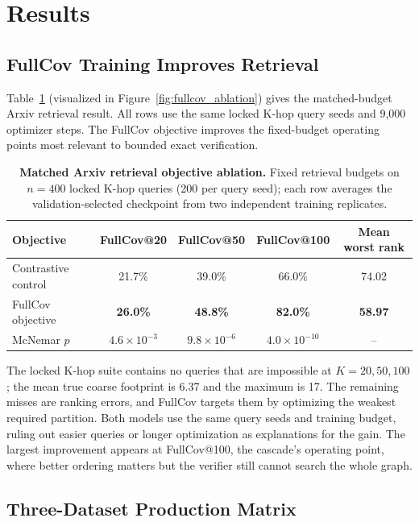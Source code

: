 \documentclass{article}
\begin{document}
\section{Results}

\subsection{FullCov Training Improves Retrieval}

Table~\ref{tab:loss_ablation} (visualized in Figure~\ref{fig:fullcov_ablation}) gives the matched-budget Arxiv retrieval result. All rows use the same locked K-hop query seeds and 9,000 optimizer steps. The FullCov objective improves the fixed-budget operating points most relevant to bounded exact verification.

\begin{table}[t]
\centering
\caption{\textbf{Matched Arxiv retrieval objective ablation.} Fixed retrieval budgets on $n{=}400$ locked K-hop queries (200 per query seed); each row averages the validation-selected checkpoint from two independent training replicates.}
\label{tab:loss_ablation}
\small
\setlength{\tabcolsep}{5pt}
\begin{tabular}{lcccc}
\toprule
\textbf{Objective} & \textbf{FullCov@20} & \textbf{FullCov@50} & \textbf{FullCov@100} & \textbf{Mean worst rank} \\
\midrule
Contrastive control & 21.7\% & 39.0\% & 66.0\% & 74.02 \\
FullCov objective & \textbf{26.0\%} & \textbf{48.8\%} & \textbf{82.0\%} & \textbf{58.97} \\
\midrule
McNemar $p$ & $4.6{\times}10^{-3}$ & $9.8{\times}10^{-6}$ & $4.0{\times}10^{-10}$ & -- \\
\bottomrule
\end{tabular}
\end{table}

The locked K-hop suite contains no queries that are impossible at $K=20,50,100$; the mean true coarse footprint is 6.37 and the maximum is 17. The remaining misses are ranking errors, and FullCov targets them by optimizing the weakest required partition. Both models use the same query seeds and training budget, ruling out easier queries or longer optimization as explanations for the gain. The largest improvement appears at FullCov@100, the cascade's operating point, where better ordering matters but the verifier still cannot search the whole graph.

\subsection{Three-Dataset Production Matrix}
\end{document}

